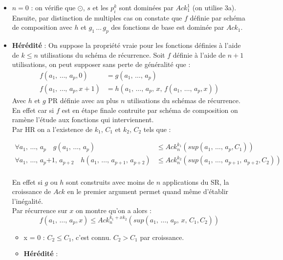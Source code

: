 \documentclass[12pt,letterpaper,boxed]{hmcpset}
\begin{document}
\begin{solution}
\begin{solution}[(d)]
\begin{itemize}

\item $n = 0$ : on vérifie que $\odot$, $s$ et les $p_{i}^{k}$ sont dominées par $Ack^{1}_{1}$ (on utilise 3a). \\
Ensuite, par distinction de multiples cas on constate que $f$ définie par schéma de composition avec $h$ et $g_{1}
 \, \dots \,g_{p}$ des fonctions de base est dominée par $Ack_{1}$.
 
 \item \textbf{Hérédité} : On suppose la propriété vraie pour les fonctions définies à l'aide de $k \leq n$ utilisations du schéma de récurrence.
Soit $f$ définie à l'aide de $n+1$ utilisations, on peut supposer sans perte de généralité que : 
\begin{align*}
f(a_{1}, \, \dots , \, a_{p}, 0) & = g(a_{1}, \, \dots , \, a_{p}) \\
f(a_{1}, \, \dots , \, a_{p}, x+1) & = h(a_{1}, \, \dots , \, a_{p}, \, x , \,  f(a_{1}, \, \dots , \, a_{p}, x))
\end{align*}
Avec $h$ et $g$ PR définie avec au plus $n$ utilisations du schémas de récurrence.
En effet car si $f$ est en étape finale contruite par schéma de composition on ramène l'étude aux fonctions qui interviennent. \\

Par HR on a l'existence de $k_{1}$, $C_{1}$ et $k_{2}$, $C_{2}$ tels que :

\begin{align*}
\forall a_{1}, \, \dots , \, a_{p} \quad g(a_{1}, \, \dots , \, a_{p}) & \leq  Ack^{k_{1}}_{n}(sup(a_{1}, \, \dots , \, a_{p}, C_{1}))\\
\forall a_{1}, \, \dots , \, a_p{+1}, \, a_{p+2} \quad  h(a_{1}, \, \dots , \, a_{p+1}, \, a_{p+2}) & \leq  Ack^{k_{2}}_{n}(sup(a_{1}, \, \dots , \, a_{p+1}, \, a_{p+2}, C_{2}))\\
\end{align*}

En effet si $g$ ou $h$ sont construits avec moins de $n$ applications du SR, la croissance de $Ack$ en le premier argument permet quand même d'établir l'inégalité. \\
Par récurrence sur $x$ on montre qu'on a alors :
$$ f(a_{1}, \, \dots , \, a_{p}, x) \leq Ack^{k_{1} + xk_{2}}_{n}(sup(a_{1}, \, \dots , \, a_{p}, \, x, \,  C_{1}, C_{2}))  $$

	\begin{itemize}[leftmargin=*]
		\item x = 0 : $C_{2} \leq C_{1}$, c'est connu. $C_{2} > C_{1}$ par croissance.
		\item \textbf{Hérédité} :
		

\end{itemize}
\end{itemize}
\end{solution}
\end{solution}
\end{document}

